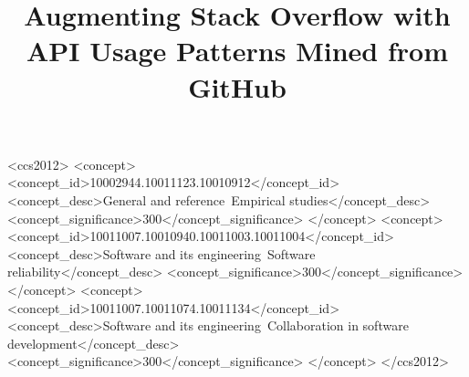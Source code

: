 \documentclass[sigconf]{acmart}
\begin{document}
\title{Augmenting Stack Overflow with API Usage Patterns Mined from GitHub}




\begin{CCSXML}
<ccs2012>
<concept>
<concept_id>10002944.10011123.10010912</concept_id>
<concept_desc>General and reference~Empirical studies</concept_desc>
<concept_significance>300</concept_significance>
</concept>
<concept>
<concept_id>10011007.10010940.10011003.10011004</concept_id>
<concept_desc>Software and its engineering~Software reliability</concept_desc>
<concept_significance>300</concept_significance>
</concept>
<concept>
<concept_id>10011007.10011074.10011134</concept_id>
<concept_desc>Software and its engineering~Collaboration in software development</concept_desc>
<concept_significance>300</concept_significance>
</concept>
</ccs2012>
\end{CCSXML}



\maketitle










\balance


\end{document}
